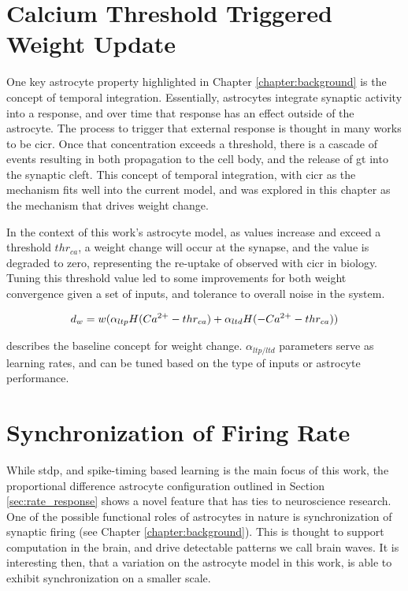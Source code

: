 \section{Calcium Threshold Triggered Weight Update}
One key astrocyte property highlighted in Chapter \ref{chapter:background} is
the concept of temporal integration. Essentially, astrocytes integrate synaptic
activity into a \ca response, and over time that \ca response has an effect
outside of the astrocyte. The process to trigger that external response is
thought in many works to be \gls{cicr}. Once that \ca concentration exceeds a
threshold, there is a cascade of events resulting in both \ca propagation to the
cell body, and the release of \gls{gt} into the synaptic cleft. This concept of
temporal integration, with \gls{cicr} as the mechanism fits well into the
current model, and was explored in this chapter as the mechanism that drives
weight change.

In the context of this work's astrocyte model, as \ca values increase and exceed
a threshold $thr_{ca}$, a weight change will occur at the synapse, and the \ca
value is degraded to zero, representing the re-uptake of \ca observed with
\gls{cicr} in biology. Tuning this threshold value led to some improvements for
both weight convergence given a set of inputs, and tolerance to overall noise in
the system.

\begin{align}
  d_w = w (\alpha_{ltp} H(Ca^{2+} - thr_{ca}) + \alpha_{ltd} H(-Ca^{2+} - thr_{ca}))  \label{eq:dw-thr}
\end{align}

 describes the baseline concept for weight
change. $\alpha_{ltp/ltd}$ parameters serve as learning rates, and can be tuned
based on the type of inputs or astrocyte performance.


\section{Synchronization of Firing Rate}
While \gls{stdp}, and spike-timing based learning is the main focus of this work, the
proportional difference astrocyte configuration outlined in Section
\ref{sec:rate_response} shows a novel feature that has ties to neuroscience
research. One of the possible functional roles of astrocytes in nature is
synchronization of synaptic firing (see Chapter \ref{chapter:background}). This
is thought to support computation in the brain, and drive detectable patterns we
call brain waves. It is interesting then, that a variation on the astrocyte
model in this work, is able to exhibit synchronization on a smaller scale.

